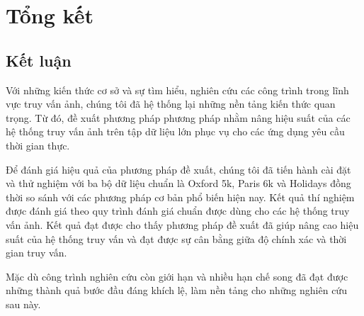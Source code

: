 \def\baselinestretch{1}
\chapter{Tổng kết}
\ifpdf
    \graphicspath{{Conclusions/ConclusionsFigs/PNG/}{Conclusions/ConclusionsFigs/PDF/}{Conclusions/ConclusionsFigs/}}
\else
    \graphicspath{{Conclusions/ConclusionsFigs/EPS/}{Conclusions/ConclusionsFigs/}}
\fi

\section{Kết luận}
Với những kiến thức cơ sở và sự tìm hiểu, nghiên cứu các công trình trong lĩnh vực truy vấn ảnh, chúng tôi đã hệ thống lại những nền tảng kiến thức quan trọng. Từ đó, đề xuất phương pháp phương pháp nhằm nâng hiệu suất của các hệ thống truy vấn ảnh trên tập dữ liệu lớn phục vụ cho các ứng dụng yêu cầu thời gian thực.

Để đánh giá hiệu quả của phương pháp đề xuất, chúng tôi đã tiến hành cài đặt và thử nghiệm với ba bộ dữ liệu chuẩn là Oxford 5k, Paris 6k và Holidays đồng thời so sánh với các phương pháp cơ bản phổ biến hiện nay. Kết quả thí nghiệm được đánh giá theo quy trình đánh giá chuẩn được dùng cho các hệ thống truy vấn ảnh. Kết quả đạt được cho thấy phương pháp đề xuất đã giúp nâng cao hiệu suất của hệ thống truy vấn và đạt được sự cân bằng giữa độ chính xác và thời gian truy vấn.

Mặc dù công trình nghiên cứu còn giới hạn và nhiều hạn chế song đã đạt được những thành quả bước đầu đáng khích lệ, làm nền tảng cho những nghiên cứu sau này.

